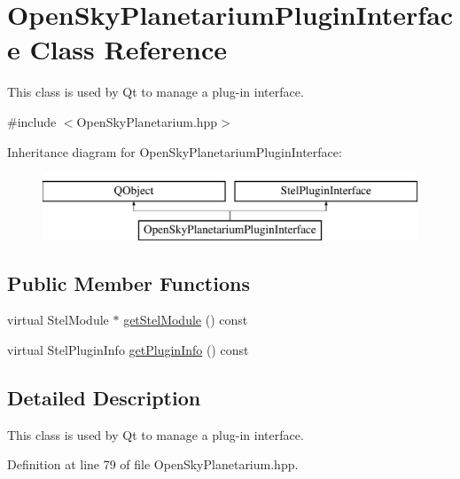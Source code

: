 \hypertarget{class_open_sky_planetarium_plugin_interface}{\section{Open\-Sky\-Planetarium\-Plugin\-Interface Class Reference}
\label{class_open_sky_planetarium_plugin_interface}
}


This class is used by Qt to manage a plug-\/in interface.  




{\ttfamily \#include $<$Open\-Sky\-Planetarium.\-hpp$>$}

Inheritance diagram for Open\-Sky\-Planetarium\-Plugin\-Interface\-:\begin{figure}[H]
\begin{center}
\leavevmode
\includegraphics[height=2.000000cm]{class_open_sky_planetarium_plugin_interface}
\end{center}
\end{figure}
\subsection*{Public Member Functions}
\begin{DoxyCompactItemize}
\item 
virtual Stel\-Module $\ast$ \hyperlink{class_open_sky_planetarium_plugin_interface_af89d90ab4d905c0818ca6bdc966ed6ee}{get\-Stel\-Module} () const 
\item 
virtual Stel\-Plugin\-Info \hyperlink{class_open_sky_planetarium_plugin_interface_afb592a06233f9bea5e6149e7bfd364aa}{get\-Plugin\-Info} () const 
\end{DoxyCompactItemize}


\subsection{Detailed Description}
This class is used by Qt to manage a plug-\/in interface. 

Definition at line 79 of file Open\-Sky\-Planetarium.\-hpp.



